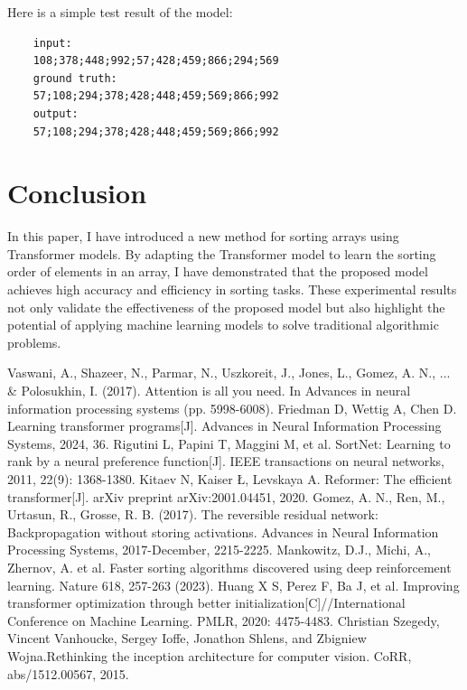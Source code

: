 \documentclass{article}
\begin{document}
Here is a simple test result of the model:
\begin{verbatim}
    input: 
    108;378;448;992;57;428;459;866;294;569
    ground truth:
    57;108;294;378;428;448;459;569;866;992
    output: 
    57;108;294;378;428;448;459;569;866;992
\end{verbatim}

\section{Conclusion}
In this paper, I have introduced a new method for sorting arrays using Transformer models. By adapting the Transformer model to learn the sorting order of elements in an array, I have demonstrated that the proposed model achieves high accuracy and efficiency in sorting tasks. These experimental results not only validate the effectiveness of the proposed model but also highlight the potential of applying machine learning models to solve traditional algorithmic problems.


\begin{thebibliography}{9}
    Vaswani, A., Shazeer, N., Parmar, N., Uszkoreit, J., Jones, L., Gomez, A. N., ... \& Polosukhin, I. (2017). Attention is all you need. In Advances in neural information processing systems (pp. 5998-6008).
    Friedman D, Wettig A, Chen D. Learning transformer programs[J]. Advances in Neural Information Processing Systems, 2024, 36.
    Rigutini L, Papini T, Maggini M, et al. SortNet: Learning to rank by a neural preference function[J]. IEEE transactions on neural networks, 2011, 22(9): 1368-1380.
    Kitaev N, Kaiser Ł, Levskaya A. Reformer: The efficient transformer[J]. arXiv preprint arXiv:2001.04451, 2020.
    Gomez, A. N., Ren, M., Urtasun, R., Grosse, R. B. (2017). The reversible residual network: Backpropagation without storing activations. Advances in Neural Information Processing Systems, 2017-December, 2215-2225.
    Mankowitz, D.J., Michi, A., Zhernov, A. et al. Faster sorting algorithms discovered using deep reinforcement learning. Nature 618, 257-263 (2023).
    Huang X S, Perez F, Ba J, et al. Improving transformer optimization through better initialization[C]//International Conference on Machine Learning. PMLR, 2020: 4475-4483.
    Christian Szegedy, Vincent Vanhoucke, Sergey Ioffe, Jonathon Shlens, and Zbigniew Wojna.Rethinking the inception architecture for computer vision. CoRR, abs/1512.00567, 2015.
\end{thebibliography}
\end{document}
